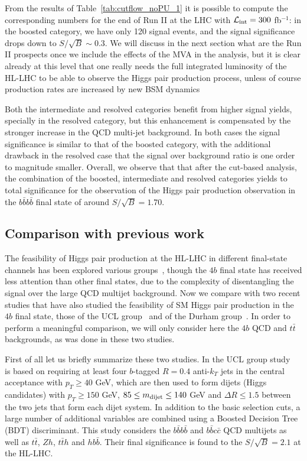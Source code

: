 From the results of Table~\ref{tab:cutflow_noPU_1}
it is possible to compute the corresponding numbers
for the end of Run II at the LHC with
$\mathcal{L}_{\rm int}=300$ fb$^{-1}$: in the boosted category,
we have only
120 signal events, and the signal significance drops down to
$S/\sqrt{B}\sim 0.3$.
%
We will discuss in the next section what are the Run II prospects
once we include the effects of the MVA in the analysis, but
it is clear already at this level that one really needs the full
integrated luminosity of the HL-LHC to be able to observe
the Higgs pair production process, unless  of course production rates are
increased by new BSM dynamics

Both the intermediate and resolved categories benefit from higher signal yields,
specially in the resolved category, but this enhancement is compensated by the stronger
increase in the QCD multi-jet background.
%
In both cases the signal significance is similar to that of the boosted category,
with the additional drawback in the resolved case that the signal over background ratio
is one order to magnitude smaller.
%
Overall, we observe that 
that after the cut-based analysis,
the combination
of the boosted, intermediate and resolved categories yields
to total significance for the observation of the Higgs pair production
observation in the $b\bar{b}b\bar{b}$ final
state of around $S/\sqrt{B}=1.70$.

\subsection{Comparison with previous work}

The feasibility of Higgs pair production at the HL-LHC in different
final-state channels
has been explored various groups~\cite{Baur:2003gp,Barger:2013jfa,
  Baur:2003gpa,Barr:2013tda,Dolan:2013rja,
  Dolan:2012rv,Papaefstathiou:2012qe,Gouzevitch:2013qca,Cooper:2013kia,Wardrope:2014kya,deLima:2014dta}, though
the $4b$ final state has received less attention than other final states,
due to the complexity of disentangling the signal over the large
QCD multijet background.
%
Now we compare with two recent studies that have also studied the
feasibility of SM Higgs pair production in the $4b$ final state,
those of the UCL group~\cite{Wardrope:2014kya} and of the
Durham group~\cite{deLima:2014dta}.
%
In order to perform a meaningful comparison, we will only consider
here the $4b$ QCD and $t\bar{t}$ backgrounds, as was done
in these two studies.

First of all let us briefly summarize these two studies.
%
In the UCL group study~\cite{Wardrope:2014kya} is based
on requiring at least four $b$-tagged $R=0.4$ anti-$k_T$ jets
in the central acceptance with $p_T \ge 40$ GeV, which are
then used to form dijets (Higgs candidates) with
$p_T \ge 150$ GeV, $85 \le m_{\rm dijet} \le 140$ GeV
and $\Delta R \le 1.5$ between the two jets that form
each dijet system.
%
In addition to the basic selection cuts, a large number
of additional variables are combined using a
Boosted Decision Tree (BDT) discriminant.
%
This study considers the $b\bar{b}b\bar{b}$ and
$b\bar{b}c\bar{c}$ QCD multijets as well as
$t\bar{t}$, $Zh$, $t\bar{t}h$ and $hb\bar{b}$.
%
Their final significance is found to the $S/\sqrt{B}=2.1$ at the HL-LHC.

